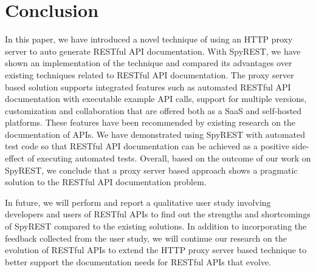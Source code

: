 \documentclass[conference]{IEEEtran}
\begin{document}
\section{Conclusion}
In this paper, we have introduced a novel technique of using an HTTP proxy server to auto generate RESTful API documentation. With SpyREST, we have shown an implementation of the technique and compared its advantages over existing techniques related to RESTful API documentation. The proxy server based solution supports integrated features such as automated RESTful API documentation with executable example API calls, support for multiple versions, customization and collaboration that are offered both as a SaaS and self-hosted platforms. These features have been recommended by existing research on the documentation of APIs. We have demonstrated using SpyREST with automated test code so that RESTful API documentation can be achieved as a positive side-effect of executing automated tests. Overall, based on the outcome of our work on SpyREST, we conclude that a proxy server based approach shows a pragmatic solution to the RESTful API documentation problem.

In future, we will perform and report a qualitative user study involving developers and users of RESTful APIs to find out the strengths and shortcomings of SpyREST compared to the existing solutions. In addition to incorporating the feedback collected from the user study, we will continue our research on the evolution of RESTful APIs to extend the HTTP proxy server based technique to better support the documentation needs for RESTful APIs that evolve.



\end{document}
